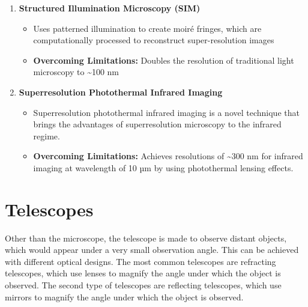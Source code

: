 \documentclass[
  a4paper,
]{book}
\providecommand{\tightlist}{%
  \setlength{\itemsep}{0pt}\setlength{\parskip}{0pt}}
\begin{document}
\begin{tcolorbox}
\begin{enumerate}
  \begin{itemize}
  \tightlist
  \item
    Similar to PALM, but uses photoswitchable fluorophores
  \item
    \textbf{Overcoming Limitations:} Achieves resolutions of
    \textasciitilde20 nm by precisely locating the centers of single
    fluorescent molecules
  \end{itemize}
\item
  \textbf{Structured Illumination Microscopy (SIM)}

  \begin{itemize}
  \tightlist
  \item
    Uses patterned illumination to create moiré fringes, which are
    computationally processed to reconstruct super-resolution images
  \item
    \textbf{Overcoming Limitations:} Doubles the resolution of
    traditional light microscopy to \textasciitilde100 nm
  \end{itemize}
\item
  \textbf{Superresolution Photothermal Infrared Imaging}

  \begin{itemize}
  \tightlist
  \item
    Superresolution photothermal infrared imaging is a novel technique
    that brings the advantages of superresolution microscopy to the
    infrared regime.
  \item
    \textbf{Overcoming Limitations:} Achieves resolutions of
    \textasciitilde300 nm for infrared imaging at wavelength of 10 µm by
    using photothermal lensing effects.
  \end{itemize}
\end{enumerate}

\end{tcolorbox}

\chapter{Telescopes}\label{telescopes}

Other than the microscope, the telescope is made to observe distant
objects, which would appear under a very small observation angle. This
can be achieved with different optical designs. The most common
telescopes are refracting telescopes, which use lenses to magnify the
angle under which the object is observed. The second type of telescopes
are reflecting telescopes, which use mirrors to magnify the angle under
which the object is observed.
\end{document}
